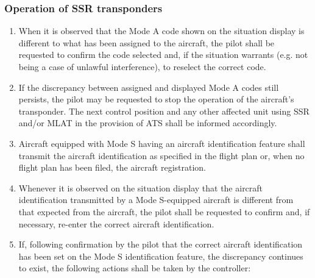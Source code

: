 \subsubsection{Operation of SSR transponders}


\begin{enumerate}
    \item When it is observed that the Mode A code shown on the situation display is different to what has been assigned to the aircraft, the pilot shall be requested to confirm the code selected and, if the situation warrants (e.g. not being a case of unlawful interference), to reselect the correct code.
    \item If the discrepancy between assigned and displayed Mode A codes still persists, the pilot may be requested to stop the operation of the aircraft's transponder. The next control position and any other affected unit using SSR and/or MLAT in the provision of ATS shall be informed accordingly.
    \item Aircraft equipped with Mode S having an aircraft identification feature shall transmit the aircraft identification as specified in the flight plan or, when no flight plan has been filed, the aircraft registration.
    \item Whenever it is observed on the situation display that the aircraft identification transmitted by a Mode S-equipped aircraft is different from that expected from the aircraft, the pilot shall be requested to confirm and, if necessary, re-enter the correct aircraft identification.
    \item If, following confirmation by the pilot that the correct aircraft identification has been set on the Mode S identification feature, the discrepancy continues to exist, the following actions shall be taken by the controller:

\end{enumerate}

